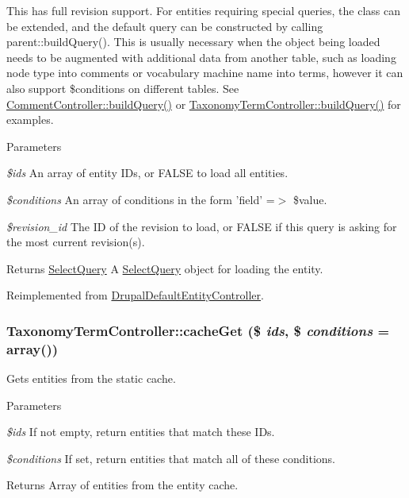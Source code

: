 This has full revision support. For entities requiring special queries, the class can be extended, and the default query can be constructed by calling parent::buildQuery(). This is usually necessary when the object being loaded needs to be augmented with additional data from another table, such as loading node type into comments or vocabulary machine name into terms, however it can also support \$conditions on different tables. See \hyperlink{classCommentController_a0feb93a67f87f04b06eb64eb0d359ca7}{CommentController::buildQuery()} or \hyperlink{classTaxonomyTermController_a38102da86b43fb5b2c3c3412cb2ba3d2}{TaxonomyTermController::buildQuery()} for examples.


\begin{DoxyParams}{Parameters}
\item[{\em \$ids}]An array of entity IDs, or FALSE to load all entities. \item[{\em \$conditions}]An array of conditions in the form 'field' =$>$ \$value. \item[{\em \$revision\_\-id}]The ID of the revision to load, or FALSE if this query is asking for the most current revision(s).\end{DoxyParams}
\begin{DoxyReturn}{Returns}
\hyperlink{classSelectQuery}{SelectQuery} A \hyperlink{classSelectQuery}{SelectQuery} object for loading the entity. 
\end{DoxyReturn}


Reimplemented from \hyperlink{classDrupalDefaultEntityController_aaa882d053aa4e04e2816b0093b79b0f8}{DrupalDefaultEntityController}.\hypertarget{classTaxonomyTermController_a9bfba8c802d79ed1dcdfbfbe915adf1b}{
\subsubsection[{cacheGet}]{\setlength{\rightskip}{0pt plus 5cm}TaxonomyTermController::cacheGet (\$ {\em ids}, \/  \$ {\em conditions} = {\ttfamily array()})}}
\label{classTaxonomyTermController_a9bfba8c802d79ed1dcdfbfbe915adf1b}
Gets entities from the static cache.


\begin{DoxyParams}{Parameters}
\item[{\em \$ids}]If not empty, return entities that match these IDs. \item[{\em \$conditions}]If set, return entities that match all of these conditions.\end{DoxyParams}
\begin{DoxyReturn}{Returns}
Array of entities from the entity cache. 
\end{DoxyReturn}


